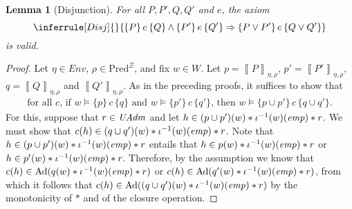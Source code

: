 \documentclass{LMCS}
\newtheorem{lemma}[theorem]{Lemma}
\theoremstyle{remark}
\newcommand{\Env}{\ensuremath{\textit{Env}}\xspace}
\newcommand{\triple}[3]{{\ensuremath{\!\left.\{ #1 \}\, #2\, \{  #3 \}\!\right.}}}
\newcommand{\wemp}{\textnormal{\textit{emp}}}
\newcommand{\den}[1]{\left\llbracket #1
  \right\rrbracket}
\newcommand{\Pred}{\ensuremath{\mathrm{Pred}}\xspace}
\newcommand{\W}{\ensuremath{W}}
\newcommand{\UNFOLD}{\ensuremath{\iota^{-1}}}
\newcommand{\X}{\ensuremath{\Xi}}
\begin{document}
\begin{lemma}[Disjunction]
For all $P,P',Q,Q'$ and $e$, the axiom 
$$
\inferrule[Disj]{
}{
  \triple{P}{e}{Q}\wedge\triple{P'}{e}{Q'} \Rightarrow \triple{P\vee P'}{e}{Q\vee Q'}
}
$$ 
is valid.
\end{lemma}

\begin{proof}
Let $\eta\in\Env$, $\rho\in\Pred^\X$, and fix $w\in\W$. 
Let $p = \den{P}_{\eta,\rho}$, $p' = \den{P'}_{\eta,\rho}$, $q = \den{Q}_{\eta,\rho}$ and $\den{Q'}_{\eta,\rho}$. 
As in the  preceding proofs, it suffices to show that 
\begin{align*}
\text{
for all $c$,
if $w\models\triple{p}{c}{q}$ and $w\models\triple{p'}{c}{q'}$, then $w\models \triple{p\cup p'}{c}{q\cup q'}$} .
\end{align*}
For this, suppose that $r\in\mathit{UAdm}$ and let $h\in(p\cup p')(w) * \UNFOLD(w)(\wemp) * r$. 
We must show that $c(h) \in (q\cup q')(w) * \UNFOLD(w)(\wemp) * r$. 
Note that $h\in(p\cup p')(w) * \UNFOLD(w)(\wemp) * r$ entails that 
$h\in p(w) * \UNFOLD(w)(\wemp) * r$ or 
$h\in p'(w) * \UNFOLD(w)(\wemp) * r$. 
Therefore, by the assumption we know that 
$c(h)\in \DCl(q(w) * \UNFOLD(w)(\wemp) * r)$ or 
$c(h)\in \DCl(q'(w) * \UNFOLD(w)(\wemp) * r)$, from which 
it follows that $c(h) \in \DCl((q\cup q')(w) * \UNFOLD(w)(\wemp) * r)$ by the monotonicity of $*$ and of the closure operation. 
\end{proof}







 
\end{document}
